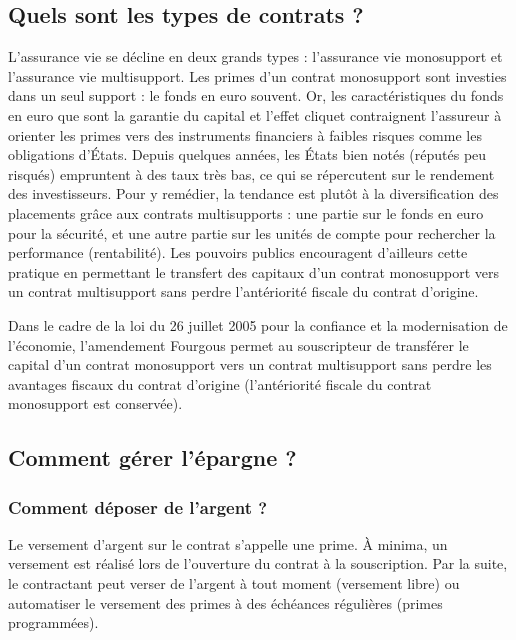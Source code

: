 \documentclass{article}
\newcommand{\blackFrame}[2]{
    \begin{tcolorbox}[colback=white,colframe=black!100!white,title={#1}]
        #2
    \end{tcolorbox}
}
\begin{document}
\subsection{Quels sont les types de contrats ?}
L'assurance vie se décline en deux grands types : l'assurance vie monosupport et l'assurance vie multisupport. Les primes d'un contrat monosupport sont investies dans un seul support : le fonds en euro souvent. Or, les caractéristiques du fonds en euro que sont la garantie du capital et l'effet cliquet contraignent l'assureur à orienter les primes vers des instruments financiers à faibles risques comme les obligations d'États. Depuis quelques années, les États bien notés (réputés peu risqués) empruntent à des taux très bas, ce qui se répercutent sur le rendement des investisseurs. Pour y remédier, la tendance est plutôt à la diversification des placements grâce aux contrats multisupports : une partie sur le fonds en euro pour la sécurité, et une autre partie sur les unités de compte pour rechercher la performance (rentabilité). Les pouvoirs publics encouragent d'ailleurs cette pratique en permettant le transfert des capitaux d'un contrat monosupport vers un contrat multisupport sans perdre l'antériorité fiscale du contrat d'origine.


\blackFrame{Amendement Fourgous}{
Dans le cadre de la loi du 26 juillet 2005 pour la confiance et la modernisation de l'économie, l'amendement Fourgous permet au souscripteur de transférer le capital d'un contrat monosupport vers un contrat multisupport sans perdre les avantages fiscaux du contrat d'origine (l'antériorité fiscale du contrat monosupport est conservée).
}

\subsection{Comment gérer l'épargne ?}
\subsubsection{Comment déposer de l'argent ?}
Le versement d'argent sur le contrat s'appelle une prime. À minima, un versement est réalisé lors de l'ouverture du contrat à la souscription. Par la suite, le contractant peut verser de l'argent à tout moment (versement libre) ou automatiser le versement des primes à des échéances régulières (primes programmées).
\end{document}
